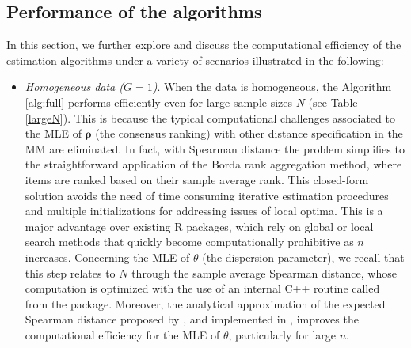 \subsection{Performance of the algorithms}
\label{app:scalability}

In this section, we further explore and discuss the computational efficiency of the estimation algorithms under a variety of scenarios illustrated in the following:
\begin{itemize}
    \item \textit{Homogeneous data ($G = 1$)}. When the data is homogeneous, the Algorithm \ref{alg:full} performs efficiently even for large sample sizes $N$ (see Table \ref{largeN}). This is because the typical computational challenges associated to the MLE of $\bm\rho$ (the consensus ranking) with other distance specification in the MM are eliminated. In fact, with Spearman distance the problem simplifies to the straightforward application of the Borda rank aggregation method, where items are ranked based on their sample average rank.
    This closed-form solution avoids the need of time consuming iterative estimation procedures and multiple initializations for addressing issues of local optima.  This is a major advantage over existing R packages, which rely on global or local search methods that quickly become computationally prohibitive as $n$ increases. Concerning the MLE of $\theta$ (the dispersion parameter), we recall that this step relates to $N$ through the sample average Spearman distance, whose computation is optimized with the use of an internal  C++ routine called from the  package. Moreover, the analytical approximation of the expected Spearman distance proposed by \cite{crispino23efficient}, and implemented in , improves the computational efficiency for the MLE of $\theta$, particularly for large $n$. 
   

\end{itemize}
